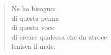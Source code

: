 \begin{verse}
Ne ho bisogno:\\
di questa penna\\
di questa voce\\
di creare qualcosa che da atroce\\
lenisca il male.

\end{verse}